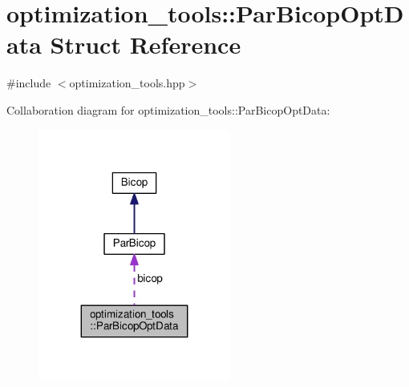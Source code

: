 \hypertarget{structoptimization__tools_1_1_par_bicop_opt_data}{}\section{optimization\+\_\+tools\+:\+:Par\+Bicop\+Opt\+Data Struct Reference}
\label{structoptimization__tools_1_1_par_bicop_opt_data}


{\ttfamily \#include $<$optimization\+\_\+tools.\+hpp$>$}



Collaboration diagram for optimization\+\_\+tools\+:\+:Par\+Bicop\+Opt\+Data\+:\nopagebreak
\begin{figure}[H]
\begin{center}
\leavevmode
\includegraphics[width=179pt]{structoptimization__tools_1_1_par_bicop_opt_data__coll__graph}
\end{center}
\end{figure}
